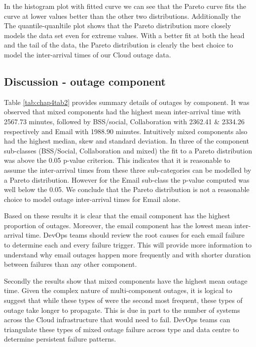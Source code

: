 In the histogram plot with fitted curve we can see that the Pareto curve fits the curve at lower values better than the other two distributions. Additionally the The quantile-quanltile plot shows that the Pareto distribution more closely models the data set even for extreme values. With a better fit at both the head and the tail of the data, the Pareto distribution is clearly the best choice to model the inter-arrival times of our Cloud outage data.

\subsection{Discussion - outage component}

Table \ref{tab:chap4tab2} provides summary details of outages by component. It was observed that mixed components had the highest mean inter-arrival time with 2567.73 minutes, followed by BSS/social, Collaboration with 2362.41 \& 2334.26 respectively and Email with 1988.90 minutes. Intuitively mixed components also had the highest median, skew and standard deviation. In three of the component sub-classes (BSS/Social, Collaboration and mixed) the fit to a Pareto distribution was above the 0.05 p-value criterion. This indicates that it is reasonable to assume the inter-arrival times from these three sub-categories can be modelled by a Pareto distribution. However for the Email sub-class the p-value computed was well below the 0.05. We conclude that the Pareto distribution is not a reasonable choice to model outage inter-arrival times for Email alone.

Based on these results it is clear that the email component has the highest proportion of outages. Moreover, the email component has the lowest mean inter-arrival time. DevOps teams should review the root causes for each email failure to determine each and every failure trigger. This will provide more information to understand why email outages happen more frequently and with shorter duration between failures than any other component. 

Secondly the results show that mixed components have the highest mean outage time. Given the complex nature of multi-component outages, it is logical to suggest that while these types of were the second most frequent, these types of outage take longer to propagate. This is due in part to the number of systems across the Cloud infrastructure that would need to fail. DevOps teams can triangulate these types of mixed outage failure across type and data centre to determine persistent failure patterns.

